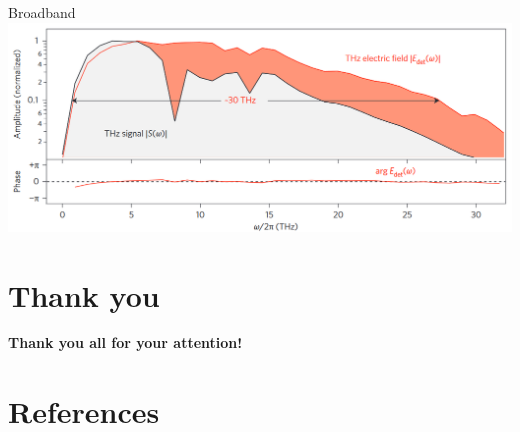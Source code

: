\documentclass[aspectratio=1610, 9pt]{beamer}
\begin{document}
\begin{frame}{Broadband}
\includegraphics[width=\textwidth]{pics/broadband.png}
\end{frame}



\section*{Thank you}
\begin{frame}{}
  \begin{center}
  \textbf{\textcolor{tugreen}{Thank you all for your attention!}}
  \end{center}
\end{frame}

\section{References }
\printbibliography
\end{document}
